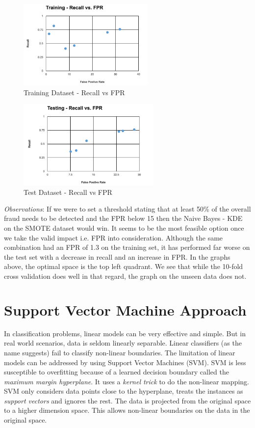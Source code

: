 \documentclass[conference]{IEEEtran}
\begin{document}
\begin{figure}
  \includegraphics[width=6.7cm]{Training.png}
  \caption{Training Dataset - Recall vs FPR}
  \label{fig:testing}
\end{figure}

\begin{figure}
  \includegraphics[width=7cm]{Testing.png}
  \caption{Test Dataset - Recall vs FPR}
  \label{fig:testing}
\end{figure}


\newpage
\textit{Observations}: If we were to set a threshold stating that at least 50\% of the overall fraud needs to be detected and the FPR below 15 then the Naive Bayes - KDE on the SMOTE dataset would win. It seems to be the most feasible option once we take the valid impact i.e. FPR into consideration. Although the same combination had an FPR of 1.3 on the training set, it has performed far worse on the test set with a decrease in recall and an increase in FPR. In the graphs above, the optimal space is the top left quadrant. We see that while the 10-fold cross validation does well in that regard, the graph on the unseen data does not.

\section{Support Vector Machine Approach}

In classification problems, linear models can be very effective and simple.  But in real world scenarios, data is seldom linearly separable. Linear classifiers (as the name suggests) fail to classify non-linear boundaries. The limitation of linear models can be addressed by using Support Vector Machines (SVM). SVM is less susceptible to overfitting because of a learned decision boundary called the \textit{maximum margin hyperplane}. It uses a \textit{kernel trick} to do the non-linear mapping. SVM only considers data points close to the hyperplane, treats the instances as \textit{support vectors} and ignores the rest. The data is projected from the original space to a higher dimension space. This allows non-linear boundaries on the data in the original space. 
\end{document}
